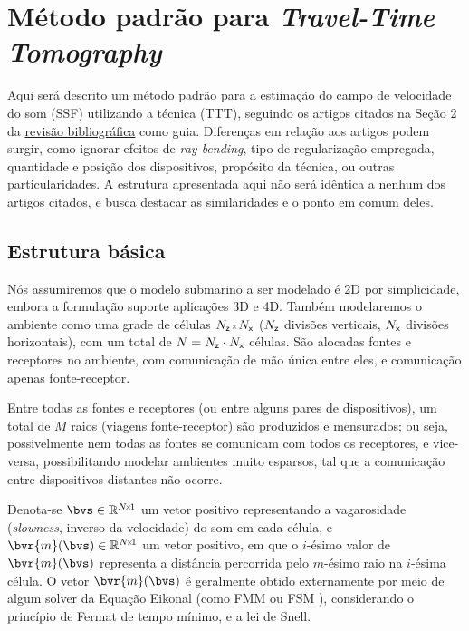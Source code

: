 \section{Método padrão para \textsl{Travel-Time Tomography}}
\label{sec:modelo-padrão-TTT}

Aqui será descrito um método padrão para a estimação do campo de velocidade do som (SSF) utilizando a técnica  (TTT), seguindo os artigos citados na Seção 2 da \href{https://www.overleaf.com/read/zrwdjxsvnqvs\#e22068}{revisão bibliográfica} \cite{revisao_bibliografica} como guia. Diferenças em relação aos artigos podem surgir, como ignorar efeitos de \textsl{ray bending}, tipo de regularização empregada, quantidade e posição dos dispositivos, propósito da técnica, ou outras particularidades. A estrutura apresentada aqui não será idêntica a nenhum dos artigos citados, e busca destacar as similaridades e o ponto em comum deles.

\subsection{Estrutura básica}
Nós assumiremos que o modelo submarino a ser modelado é 2D por simplicidade, embora a formulação suporte aplicações 3D e 4D. Também modelaremos o ambiente como uma grade de células $\sz{N_{\z}}{N_{\x}}$ ($N_{{\textsf{z}}}$ divisões verticais, $N_{{\textsf{x}}}$ divisões horizontais), com um total de $N = N_{{\textsf{z}}} \cdot N_{{\textsf{x}}}$ células. São alocadas fontes e receptores no ambiente, com comunicação de mão única entre eles, e comunicação apenas fonte-receptor.

Entre todas as fontes e receptores (ou entre alguns pares de dispositivos), um total de $M$ raios (viagens fonte-receptor) são produzidos e mensurados; ou seja, possivelmente nem todas as fontes se comunicam com todos os receptores, e vice-versa, possibilitando modelar ambientes muito esparsos, tal que a comunicação entre dispositivos distantes não ocorre.

Denota-se $\bvs \in \re^{\sz{N}{1}}$ um vetor positivo representando a vagarosidade (\textsl{slowness}, inverso da velocidade) do som em cada célula, e $\bvr{m}(\bvs) \in \re^{\sz{N}{1}}$ um vetor positivo, em que o $i$-ésimo valor de $\bvr{m}(\bvs)$ representa a distância percorrida pelo $m$-ésimo raio na $i$-ésima célula. O vetor $\bvr{m}(\bvs)$ é geralmente obtido externamente por meio de algum solver da Equação Eikonal (como FMM \cite{alton_fast_2009} ou FSM \cite{jeong_fast_2008}), considerando o princípio de Fermat de tempo mínimo, e a lei de Snell.

